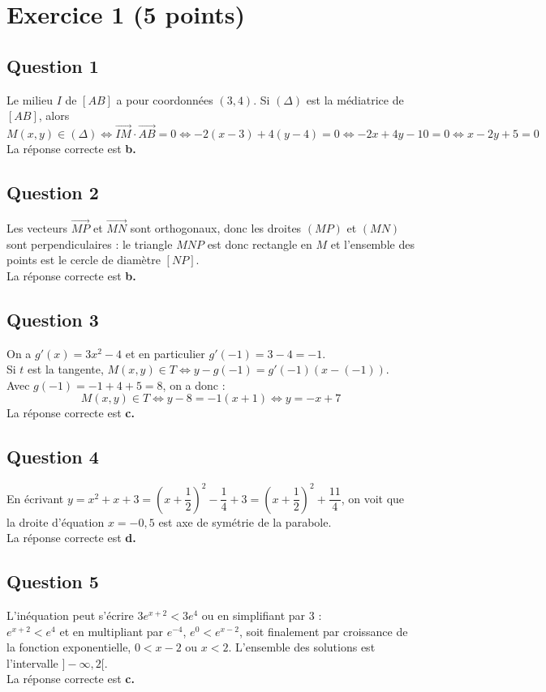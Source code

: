 \section*{Exercice 1 (5 points)}
	
	\subsection*{Question 1}
	Le milieu $I$ de $[AB]$ a pour coordonnées $(3, 4)$. Si $(\Delta)$ est la médiatrice de $[AB]$, alors
	\[
	M(x, y) \in (\Delta) \iff \overrightarrow{IM} \cdot \overrightarrow{AB} = 0 \iff -2(x - 3) + 4(y - 4) = 0 \iff -2x + 4y - 10 = 0 \iff x - 2y + 5 = 0
	\]
	La réponse correcte est \textbf{b.}
	
	\subsection*{Question 2}
	Les vecteurs $\overrightarrow{MP}$ et $\overrightarrow{MN}$ sont orthogonaux, donc les droites $(MP)$ et $(MN)$ sont perpendiculaires : le triangle $MNP$ est donc rectangle en $M$ et l’ensemble des points est le cercle de diamètre $[NP]$.\\ La réponse correcte est \textbf{b.}
	
	\subsection*{Question 3}
	On a $g'(x) = 3x^2 - 4$ et en particulier $g'(-1) = 3 - 4 = -1$.\\ Si $t$ est la tangente, $M(x, y) \in T \iff y - g(-1) = g'(-1)(x - (-1))$.\\ Avec $g(-1) = -1 + 4 + 5 = 8$, on a donc :
	\[
	M(x, y) \in T \iff y - 8 = -1(x + 1) \iff y = -x + 7
	\]
	La réponse correcte est \textbf{c.}
	
	\subsection*{Question 4}
	En écrivant $y = x^2 + x + 3 = \left( x + \dfrac{1}{2} \right)^2 - \dfrac{1}{4} + 3 = \left( x + \dfrac{1}{2} \right)^2 + \dfrac{11}{4}$, on voit que la droite d’équation $x = -0,5$ est axe de symétrie de la parabole.\\
	 La réponse correcte est \textbf{d.}
	
	\subsection*{Question 5}
	L’inéquation peut s’écrire $3e^{x+2} < 3e^4$ ou en simplifiant par 3 :\\ $e^{x+2} < e^4$ et en multipliant par $e^{-4}$, $e^{0} < e^{x-2}$, soit finalement par croissance de la fonction exponentielle, $0 < x - 2$ ou $x < 2$. L’ensemble des solutions est l’intervalle $] -\infty, 2[$.\\
	 La réponse correcte est \textbf{c.}
